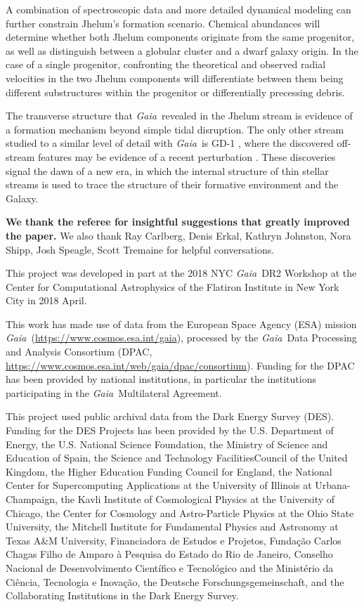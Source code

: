 \documentclass[twocolumn]{aastex62}
\newcommand{\acronym}[1]{{\small{#1}}}
\newcommand{\gaia}{\textsl{Gaia}}
\newcommand{\changes}[1]{{\textbf{#1}}}
\begin{document}
A combination of spectroscopic data and more detailed dynamical modeling can further constrain Jhelum's formation scenario.
Chemical abundances will determine whether both Jhelum components originate from the same progenitor, as well as distinguish between a globular cluster and a dwarf galaxy origin.
In the case of a single progenitor, confronting the theoretical and observed radial velocities in the two Jhelum components will differentiate between them being different substructures within the progenitor or differentially precessing debris.

The transverse structure that \gaia\ revealed in the Jhelum stream is evidence of a formation mechanism beyond simple tidal disruption.
The only other stream studied to a similar level of detail with \gaia\ is GD-1 \citep{pwb}, where the discovered off-stream features may be evidence of a recent perturbation \citep{bonaca2018}.
These discoveries signal the dawn of a new era, in which the internal structure of thin stellar streams is used to trace the structure of their formative environment and the Galaxy.

\vspace{0.5cm}
\acknowledgements
\changes{We thank the referee for insightful suggestions that greatly improved the paper.}
We also thank Ray Carlberg, Denis Erkal, Kathryn Johnston, Nora Shipp, Josh Speagle, Scott Tremaine for helpful conversations.

This project was developed in part at the 2018 \acronym{NYC} \gaia\ \acronym{DR2} Workshop at the Center for Computational Astrophysics of the Flatiron Institute in New York City in 2018 April.

This work has made use of data from the European Space Agency (\acronym{ESA}) mission \gaia\ (\url{https://www.cosmos.esa.int/gaia}), processed by the \gaia\ Data Processing and Analysis Consortium (\acronym{DPAC}, \url{https://www.cosmos.esa.int/web/gaia/dpac/consortium}). Funding for the \acronym{DPAC} has been provided by national institutions, in particular the institutions participating in the \gaia\ Multilateral Agreement.

This project used public archival data from the Dark Energy Survey (DES). Funding for the DES Projects has been provided by the U.S. Department of Energy, the U.S. National Science Foundation, the Ministry of Science and Education of Spain, the Science and Technology FacilitiesCouncil of the United Kingdom, the Higher Education Funding Council for England, the National Center for Supercomputing Applications at the University of Illinois at Urbana-Champaign, the Kavli Institute of Cosmological Physics at the University of Chicago, the Center for Cosmology and Astro-Particle Physics at the Ohio State University, the Mitchell Institute for Fundamental Physics and Astronomy at Texas A\&M University, Financiadora de Estudos e Projetos, Funda{\c c}{\~a}o Carlos Chagas Filho de Amparo {\`a} Pesquisa do Estado do Rio de Janeiro, Conselho Nacional de Desenvolvimento Cient{\'i}fico e Tecnol{\'o}gico and the Minist{\'e}rio da Ci{\^e}ncia, Tecnologia e Inova{\c c}{\~a}o, the Deutsche Forschungsgemeinschaft, and the Collaborating Institutions in the Dark Energy Survey.
\end{document}
